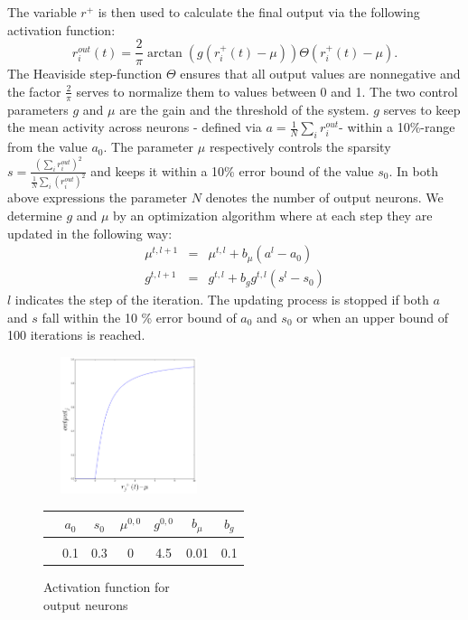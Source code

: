 \documentclass[a4paper, 12pt]{article}
\begin{document}
\noindent The variable $r^+$ is then used to calculate the final output via the following activation function: 
	\begin{equation}
	r_i^{out}(t)=\frac{2}{\pi}\arctan(g(r_i^+(t)-\mu))\Theta( r_i^+(t)-\mu).
	\end{equation}
The Heaviside step-function $\Theta$ ensures that all output values are nonnegative and the factor $\frac{2}{\pi}$ serves to normalize them to values between 0 and 1.  \newline
The two control parameters $g$ and $\mu$ are the gain and the threshold of the system. $g$ serves to keep the mean activity across neurons - defined via $a= \frac{1}{N}\sum_ir_i^{out}$- within a 10\%-range from the value $a_0$. The parameter $\mu$ respectively controls the sparsity $s=\frac{(\sum_ir_i^{out})^2}{\frac{1}{N}\sum_i (r_i^{out})^2}$ and keeps it within a 10\% error bound of the value $s_0$. In both above expressions the parameter $N$ denotes the number of output neurons. We determine $g$ and $\mu$ by an optimization algorithm where at each step they are updated in the following way: 
	\begin{eqnarray}
	\mu^{t, l+1} &=& \mu^{t,l}+b_\mu(a^{l}-a_0)\\
	g^{t,l+1} &=& g^{t,l}+ b_gg^{t,l}(s^l-s_0)
	\end{eqnarray}
\noindent $l$ indicates the step of the iteration. The updating process is stopped if both $a$ and $s$ fall within the 10 \% error bound of $a_0$ and $s_0$ or when an upper bound of 100 iterations is reached. 
	
\begin{figure}[h]
\setlength{\abovecaptionskip}{5pt}
\setlength{\belowcaptionskip}{0pt}	
	\begin{minipage}[t]{0.5\textwidth}\vspace{0pt}
	\includegraphics[width=5cm, height=4cm]{pics/output_function.png}
	\footnotesize{\caption{Activation function for\\ output neurons}}
	\end{minipage}
\hfill
	\begin{minipage}[t]{0.5\textwidth}\vspace{20pt}
	\begin{tabular}{c|cccccc}
	& $a_0$ & $s_0$ & $\mu^{0,0}$ & $g^{0,0}$ & $b_\mu$ & $b_g$\\
	\hline\\
	& 0.1 & 0.3 & 0 & 4.5 & 0.01 & 0.1\\
	\end{tabular}
	\footnotesize{}
	\end{minipage}
\end{figure}	
%
%
%
\end{document}

